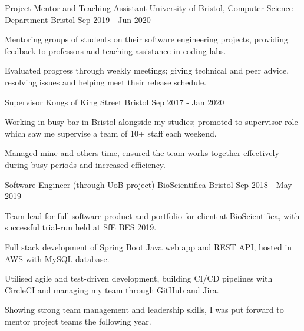 \vspace{-0.1cm}

\begin{cventries}

  \cventry
    {Project Mentor and Teaching Assistant} %
    {University of Bristol, Computer Science Department} %
    {Bristol} %
    {Sep 2019 - Jun 2020} %
    {
      \begin{cvitems} %
        \item Mentoring groups of students on their software engineering projects, providing feedback to professors and teaching assistance in coding labs.
        \item Evaluated progress through weekly meetings; giving technical and peer advice, resolving issues and helping meet their release schedule.
      \end{cvitems}
    }

  \cventry
    {Supervisor} %
    {Kongs of King Street} %
    {Bristol} %
    {Sep 2017 - Jan 2020} %
    {
      \begin{cvitems} %
        \item Working in busy bar in Bristol alongside my studies; promoted to supervisor role which saw me supervise a team of 10+ staff each weekend.
        \item Managed mine and others time, ensured the team works together effectively during busy periods and increased efficiency.
      \end{cvitems}
    }

  \cventry
    {Software Engineer (through UoB project)} %
    {BioScientifica} %
    {Bristol} %
    {Sep 2018 - May 2019} %
    {
      \begin{cvitems} %
        \item Team lead for full software product and portfolio for client at BioScientifica, with successful trial-run held at SfE BES 2019.
        \item Full stack development of Spring Boot Java web app and REST API, hosted in AWS with MySQL database.
        \item Utilised agile and test-driven development, building CI/CD pipelines with CircleCI and managing my team through GitHub and Jira.
        \item Showing strong team management and leadership skills, I was put forward to mentor project teams the following year.
      \end{cvitems}
    }


\end{cventries}
